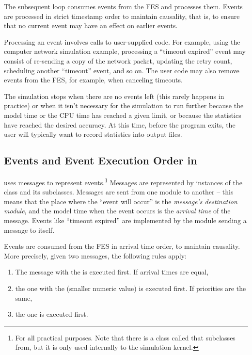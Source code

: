 The subsequent loop consumes events from the FES and processes
them. Events are processed in strict timestamp order
to maintain causality, that is, to ensure that no current event may have
an effect on earlier events.

Processing an event involves calls to user-supplied code. For example,
using the computer network simulation example, processing a ``timeout
expired'' event may consist of re-sending a copy of the network
packet, updating the retry count, scheduling another ``timeout''
event, and so on. The user code may also remove events from the FES,
for example, when canceling timeouts.

The simulation stops when there are no events left (this rarely happens
in practice) or when it isn't necessary for the simulation
to run further because the model time or the CPU time has reached
a given limit, or because the statistics have reached the desired
accuracy. At this time, before the program exits, the user
will typically want to record statistics into output files.


\subsection{Events and Event Execution Order in {\opp}}
\label{sec:simple-modules:events-in-opp}

{\opp} uses messages to represent
events.\footnote{For all practical purposes. Note that there
is a class called  that  subclasses from,
but it is only used internally to the simulation kernel.}
Messages are represented by instances of the  class
and its subclasses. Messages are sent from one module to another -- this
means that the place where the ``event will occur'' is the
\textit{message's destination module}, and the model time when the
event occurs is the \textit{arrival time} of the
message. Events like ``timeout expired'' are implemented by the
module sending a message to itself.

Events are consumed from the FES in arrival time order, to
maintain causality. More precisely, given two messages, the following
rules apply:

\begin{enumerate}
\item The message with the  is executed
    first. If arrival times are equal,
\item the one with the  (smaller
    numeric value) is executed first. If priorities are the same,
\item the one  is executed first.
\end{enumerate}

